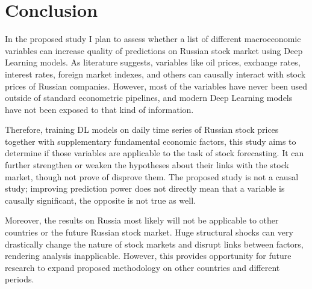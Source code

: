 \documentclass[stu]{apa7}
\begin{document}
\section{Conclusion}

In the proposed study I plan to assess whether a list of different macroeconomic variables can increase quality of predictions on Russian stock market using Deep Learning models. As literature suggests, variables like oil prices, exchange rates, interest rates, foreign market indexes, and others can causally interact with stock prices of Russian companies. However, most of the variables have never been used outside of standard econometric pipelines, and modern Deep Learning models have not been exposed to that kind of information.

Therefore, training DL models on daily time series of Russian stock prices together with supplementary fundamental economic factors, this study aims to determine if those variables are applicable to the task of stock forecasting.
It can further strengthen or weaken the hypotheses about their links with the stock market, though not prove of disprove them. The proposed study is not a causal study; improving prediction power does not directly mean that a variable is causally significant, the opposite is not true as well.

Moreover, the results on Russia most likely will not be applicable to other countries or the future Russian stock market. Huge structural shocks can very drastically change the nature of stock markets and disrupt links between factors, rendering analysis inapplicable. However, this provides opportunity for future research to expand proposed methodology on other countries and different periods.

\printbibliography
% 
\end{document}
